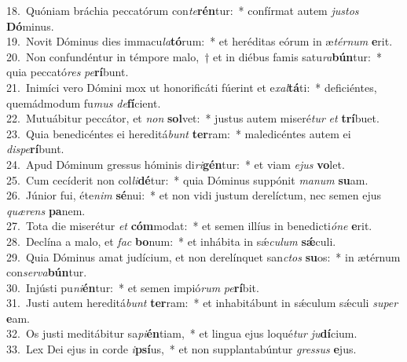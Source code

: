 {18.~}Quóniam bráchia peccatórum con\textit{te}\textbf{rén}tur:~* confírmat autem \textit{ju}\textit{stos} \textbf{Dó}minus.\\
{19.~}Novit Dóminus dies immacu\textit{la}\textbf{tó}rum:~* et heréditas eórum in æ\textit{tér}\textit{num} \textbf{e}rit.\\
{20.~}Non confundéntur in témpore malo,~† et in diébus famis satu\textit{ra}\textbf{bún}tur:~* quia peccató\textit{res} \textit{pe}\textbf{rí}bunt.\\
{21.~}Inimíci vero Dómini mox ut honorificáti fúerint et e\textit{xal}\textbf{tá}ti:~* deficiéntes, quemádmodum fu\textit{mus} \textit{de}\textbf{fí}cient.\\
{22.~}Mutuábitur peccátor, et \textit{non} \textbf{sol}vet:~* justus autem miseré\textit{tur} \textit{et} \textbf{trí}buet.\\
{23.~}Quia benedicéntes ei hereditá\textit{bunt} \textbf{ter}ram:~* maledicéntes autem ei \textit{di}\textit{spe}\textbf{rí}bunt.\\
{24.~}Apud Dóminum gressus hóminis di\textit{ri}\textbf{gén}tur:~* et viam \textit{e}\textit{jus} \textbf{vo}let.\\
{25.~}Cum cecíderit non col\textit{li}\textbf{dé}tur:~* quia Dóminus suppónit \textit{ma}\textit{num} \textbf{su}am.\\
{26.~}Júnior fui, éte\textit{nim} \textbf{sé}nui:~* et non vidi justum derelíctum, nec semen ejus \textit{quæ}\textit{rens} \textbf{pa}nem.\\
{27.~}Tota die miserétur \textit{et} \textbf{cóm}modat:~* et semen illíus in benedicti\textit{ó}\textit{ne} \textbf{e}rit.\\
{28.~}Declína a malo, et \textit{fac} \textbf{bo}num:~* et inhábita in sǽ\textit{cu}\textit{lum} \textbf{sǽ}culi.\\
{29.~}Quia Dóminus amat judícium, et non derelínquet san\textit{ctos} \textbf{su}os:~* in ætérnum con\textit{ser}\textit{va}\textbf{bún}tur.\\
{30.~}Injústi pu\textit{ni}\textbf{én}tur:~* et semen impió\textit{rum} \textit{pe}\textbf{rí}bit.\\
{31.~}Justi autem hereditá\textit{bunt} \textbf{ter}ram:~* et inhabitábunt in sǽculum sǽculi \textit{su}\textit{per} \textbf{e}am.\\
{32.~}Os justi meditábitur sa\textit{pi}\textbf{én}tiam,~* et lingua ejus loqué\textit{tur} \textit{ju}\textbf{dí}cium.\\
{33.~}Lex Dei ejus in corde \textit{i}\textbf{psí}us,~* et non supplantabúntur \textit{gres}\textit{sus} \textbf{e}jus.\\
